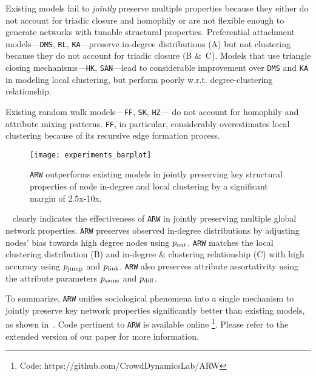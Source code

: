 Existing models fail to \textit{jointly} preserve multiple properties
because they either do not account for triadic closure and homophily
or are not flexible enough to generate networks with tunable structural properties.
Preferential attachment models---\texttt{DMS}, \texttt{RL}, \texttt{KA}---preserve in-degree
distributions (A) but not clustering because they do not account for triadic closure
(B \&~C).
Models that use triangle closing mechanisms---\texttt{HK}, \texttt{SAN}---lead to considerable improvement
over \texttt{DMS} and \texttt{KA} in modeling local clustering, but perform poorly w.r.t. degree-clustering
relationship.

Existing random walk models---\texttt{FF}, \texttt{SK}, \texttt{HZ}---
do not account for homophily and attribute mixing patterns.
\texttt{FF}, in particular, considerably overestimates local clustering because of its recursive edge
formation process.

\begin{figure}
	\centering
	\texttt{[image: experiments\_barplot]}
		\caption{\texttt{ARW} outperforms
			existing models in jointly preserving key structural properties of node in-degree
			and local clustering by a significant margin of 2.5x-10x.
		}
		\label{fig:barplot}
		\vspace{-14pt}
\end{figure}

~ clearly indicates the effectiveness
of \texttt{ARW} in {jointly} preserving multiple
global network properties. \texttt{ARW} preserves observed
in-degree distributions by adjusting nodes' bias towards high degree nodes
using $p_{\scriptsize\mbox{out}}$.
\texttt{ARW} matches the local clustering
distribution  (B) and in-degree \& clustering relationship
(C) with high accuracy using $p_{\scriptsize\mbox{jump}}$ and
$p_{\scriptsize\mbox{link}}$. \texttt{ARW} also preserves attribute assortativity using
the attribute parameters $p_{\scriptsize\mbox{same}}$ and $p_{\scriptsize\mbox{diff}}$.

To summarize, \texttt{ARW} unifies sociological phenomena into a single
mechanism to jointly preserve key network properties significantly
better than existing models, as shown in~.
Code pertinent to \texttt{ARW} is available online \footnote{Code: https://github.com/CrowdDynamicsLab/ARW}.
Please refer to the extended version of
our paper \cite{shah2017growing} for
more information.
